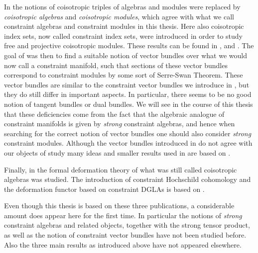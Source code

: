 \documentclass{memoir}
\begin{document}
In \cite{dippell.menke.waldmann:2022a} the notions of coisotropic triples of algebras and modules were replaced by
\emph{coisotropic algebras} and \emph{coisotropic modules}, which agree with what we call constraint algebras and constraint modules in this thesis.
Here also coisotropic index sets, now called constraint index sets, were introduced in order to study
free and projective coisotropic modules.
These results can be found in \cite[sec:ConIndSets]{Dippell2023}, \cite[sec:FreeConMod]{Dippell2023} and
\cite[sec:ProjectiveConModules]{Dippell2023}.
The goal of \cite{dippell.menke.waldmann:2022a} was then to find a suitable notion of vector bundles
over what we would now call a constraint manifold, such that sections of these vector bundles correspond to 
constraint modules by some sort of Serre-Swan Theorem.
These vector bundles are similar to the constraint vector bundles we introduce in
\cite[sec:ConVectorBundles]{Dippell2023}, but they do still differ in important aspects.
In particular, there seems to be no good notion of tangent bundles or dual bundles.
We will see in the course of this thesis that these deficiencies come from the fact that the algebraic analogue of constraint manifolds
is given by \emph{strong} constraint algebras, and hence when searching for the correct notion of vector bundles one should also consider \emph{strong} constraint modules.
Although the vector bundles introduced in \cite{dippell.menke.waldmann:2022a} do not agree with our objects of study many ideas and smaller results used in \cite[chap:ConstraintGeometricStructures]{Dippell2023} are based on \cite{dippell.menke.waldmann:2022a}.

Finally, in \cite{dippell.esposito.waldmann:2022a} the formal deformation theory of what was still called coisotropic algebras was studied.
The introduction of constraint Hochschild cohomology and the deformation functor based on constraint DGLAs is based on
\cite{dippell.esposito.waldmann:2022a}.

Even though this thesis is based on these three publications, a considerable amount does appear here for the first time.
In particular the notions of \emph{strong} constraint algebras and related objects, together with the strong tensor product, as well as the notion of constraint vector bundles have not been studied before.
Also the three main results as introduced above have not appeared elsewhere.
 
 
\end{document}
